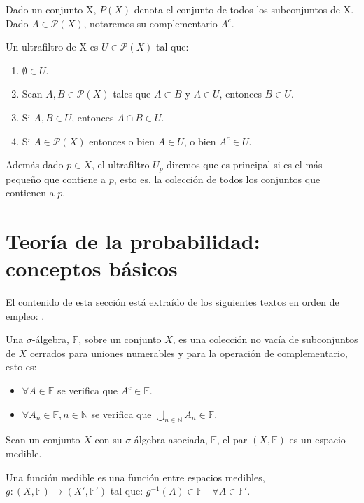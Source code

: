 \documentclass[../proyecto.tex]{memoir}
\begin{document}
Dado un conjunto X, $P(X)$ denota el conjunto de todos los subconjuntos de X. Dado $A \in \mathcal{P}(X)$, notaremos su complementario $A^{c}$. 
\begin{defi}
Un ultrafiltro de X es $U \in \mathcal{P}(X)$ tal que:

\begin{enumerate}
\item $\emptyset \in U$.
\item Sean $A,B \in \mathcal{P}(X)$ tales que $A \subset B$ y $ A \in U$, entonces $B \in U$.
\item Si $A,B \in U$, entonces $A \cap B \in U$.
\item Si $A \in \mathcal{P}(X)$ entonces o bien $A \in U$, o bien $ A^{c} \in U$.
\end{enumerate}

Además dado $p \in X$, el ultrafiltro $U_{p}$ diremos que es principal si es el más pequeño que contiene a $p$, esto es, la colección de todos los conjuntos que contienen a $p$.
\end{defi}

\section{Teoría de la probabilidad: conceptos básicos}

El contenido de esta sección está extraído de los siguientes textos en orden de empleo: \cite{elLibro, grandesNumeros, loeve}. 

\begin{defi}
Una $\sigma$-álgebra, $\mathds{F}$, sobre un conjunto $X$, es una colección no vacía de subconjuntos de $X$ cerrados para uniones numerables y para la operación de complementario, esto es:
\begin{itemize}
\item $\forall A \in \mathds{F}$ se verifica que $A^{c} \in \mathds{F}$.
\item $ \forall A_{n} \in \mathds{F}, n \in \mathds{N} $ se verifica que $\bigcup _{n \in \mathds{N}} A_{n} \in \mathds{F}$.
\end{itemize}
\end{defi}

\begin{defi}
Sean un conjunto $X$ con su $\sigma$-álgebra asociada, $\mathds{F}$, el par $(X, \mathds{F})$ es un espacio medible. 
\end{defi}

\begin{defi}
Una función medible es una función entre espacios medibles, $g: (X, \mathds{F}) \rightarrow (X', \mathds{F}')$ tal que: $g^{-1}(A) \in \mathds{F} \quad \forall A \in \mathds{F}'$.
\end{defi}
\end{document}
